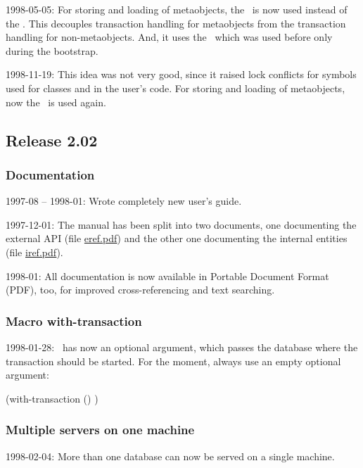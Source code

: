 1998-05-05: For storing and loading of metaobjects, the
\ is now used instead of the
. This decouples transaction handling
for metaobjects from the transaction handling for
non-metaobjects. And, it uses the \ which
was used before only during the bootstrap.

1998-11-19: This idea was not very good, since it raised lock
conflicts for symbols used for classes and in the user's code.  For
storing and loading of metaobjects, now the
\ is used again.

\subsection{Release 2.02}

\subsubsection{Documentation}

1997-08 -- 1998-01: Wrote completely new user's guide.

1997-12-01: The manual has been split into two documents, one
documenting the external API (file \url{eref.pdf}) and the other one
documenting the internal entities (file \url{iref.pdf}).

1998-01: All documentation is now available in Portable Document
Format (PDF), too, for improved cross-referencing and text searching.

\subsubsection{Macro with-transaction}

1998-01-28: \ has now an optional argument,
which passes the database where the transaction should be started. For
the moment, always use an empty optional argument:
\begin{IndentedCompactCode}
(with-transaction ()
  )
\end{IndentedCompactCode}

\subsubsection{Multiple servers on one machine}

1998-02-04: More than one database can now be served on a single
machine.

